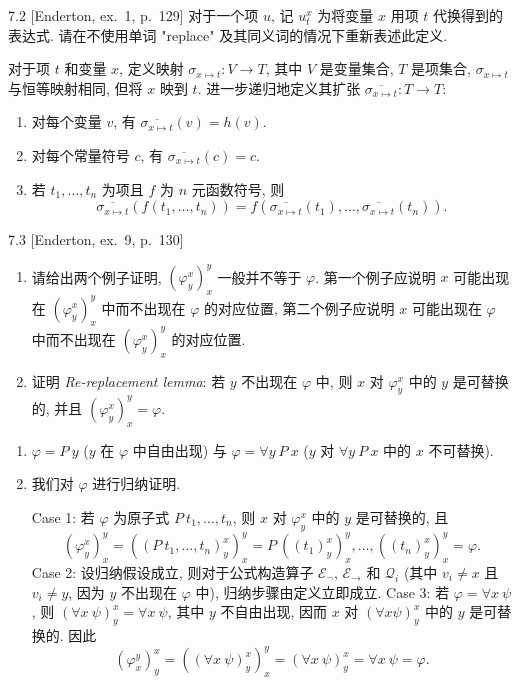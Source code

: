 \begin{exercise}{7.2}
  [Enderton, ex.~1, p.~129]
  对于一个项 $u$, 记 $u_t^x$ 为将变量 $x$ 用项 $t$ 代换得到的表达式. 请在不使用单词 "replace" 及其同义词的情况下重新表述此定义.
\end{exercise}

对于项 $t$ 和变量 $x$, 定义映射 $\sigma_{x\mapsto t}:V\rightarrow T$, 其中 $V$ 是变量集合, $T$ 是项集合, $\sigma_{x\mapsto t}$ 与恒等映射相同, 但将 $x$ 映到 $t$. 进一步递归地定义其扩张 $\overline{\sigma_{x\mapsto t}}:T\rightarrow T$:
\begin{enumerate}
  \item 对每个变量 $v$, 有 $\overline{\sigma_{x\mapsto t}}(v)=h(v)$.
  \item 对每个常量符号 $c$, 有 $\overline{\sigma_{x\mapsto t}}(c)=c$.
  \item 若 $t_1,\dots,t_n$ 为项且 $f$ 为 $n$ 元函数符号, 则
        \[\overline{\sigma_{x\mapsto t}}(f(t_1,\dots,t_n))=f(\overline{\sigma_{x\mapsto t}}(t_1),\dots,\overline{\sigma_{x\mapsto t}}(t_n)).\]
\end{enumerate}

\begin{exercise}{7.3}
  [Enderton, ex.~9, p.~130]
  \begin{enumerate}[label=(\alph*)]
    \item 请给出两个例子证明, $(\varphi_y^x)_x^y$ 一般并不等于 $\varphi$. 第一个例子应说明 $x$ 可能出现在 $(\varphi_y^x)_x^y$ 中而不出现在 $\varphi$ 的对应位置, 第二个例子应说明 $x$ 可能出现在 $\varphi$ 中而不出现在 $(\varphi_y^x)_x^y$ 的对应位置.
    \item 证明 \textit{Re-replacement lemma}: 若 $y$ 不出现在 $\varphi$ 中, 则 $x$ 对 $\varphi_y^x$ 中的 $y$ 是可替换的, 并且 $(\varphi_y^x)_x^y=\varphi$.\qedhere
  \end{enumerate}
\end{exercise}

\begin{enumerate}[label=(\alph*)]
  \item $\varphi=P\ y$ ($y$ 在 $\varphi$ 中自由出现) 与 $\varphi=\forall y\ P\ x$ ($y$ 对 $\forall y\ P\ x$ 中的 $x$ 不可替换).
  \item
        我们对 $\varphi$ 进行归纳证明.

        Case 1: 若 $\varphi$ 为原子式 $P\ t_1,\dots,t_n$, 则 $x$ 对 $\varphi_y^x$ 中的 $y$ 是可替换的, 且
        \[
          (\varphi_y^x)_x^y = ((P\ t_1,\dots,t_n)_y^x)_x^y = P\ ((t_1)_y^x)_x^y,\dots,((t_n)_y^x)_x^y=\varphi.
        \]
        Case 2: 设归纳假设成立, 则对于公式构造算子 $\mathcal{E}_{\neg}$, $\mathcal{E}_{\rightarrow}$ 和 $\mathcal{Q}_i$ (其中 $v_i\neq x$ 且 $v_i\neq y$, 因为 $y$ 不出现在 $\varphi$ 中), 归纳步骤由定义立即成立.\newline
        Case 3: 若 $\varphi=\forall x\ \psi$, 则 $(\forall x\ \psi)_y^x=\forall x\ \psi$, 其中 $y$ 不自由出现, 因而 $x$ 对 $(\forall x \psi)_y^x$ 中的 $y$ 是可替换的. 因此
        \[
          (\varphi_x^y)_y^x=((\forall x\ \psi)_y^x)_x^y=(\forall x\ \psi)_y^x=\forall x\ \psi=\varphi.
        \]
\end{enumerate}
